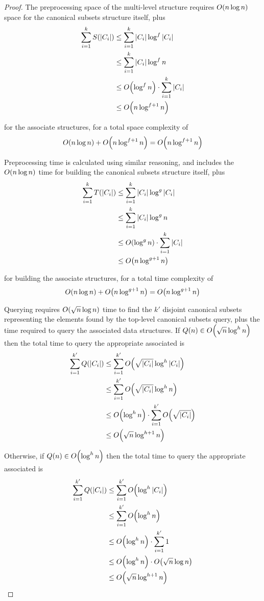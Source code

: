 \begin{proof}
The preprocessing space of the multi-level structure requires $O\!\left(n \log{n}\right)$ space for the canonical subsets structure itself, plus
\[
\begin{split}
\sum_{i=1}^k{S(|C_i|)}
&\leq \sum_{i=1}^k{|C_i| \log^f{|C_i|}} \\
%
&\leq \sum_{i=1}^k{|C_i| \log^f{n}} \\
%
&\leq \BigOh{\log^f{n}} \cdot \sum_{i=1}^k{|C_i|} \\
%
&\leq \BigOh{n\log^{f+1}{n}}
\end{split}
\]

\noindent for the associate structures, for a total space complexity of
\[
O\!\left(n \log{n}\right) + O\!\left(n\log^{f+1}{n}\right) = O\!\left(n\log^{f+1}{n}\right)
\]

Preprocessing time is calculated using similar reasoning, and includes the $O\!\left(n \log{n}\right)$ time for building the canonical subsets structure itself, plus
\[
\begin{split}
\sum_{i=1}^k{T(|C_i|)}
&\leq \sum_{i=1}^k{|C_i| \log^g{|C_i|}} \\
%
&\leq \sum_{i=1}^k{|C_i| \log^g{n}} \\
%
&\leq \BigOh{\log^g{n}} \cdot \sum_{i=1}^k{|C_i|} \\
%
&\leq \BigOh{n\log^{g+1}{n}}
\end{split}
\]

\noindent for building the associate structures, for a total time complexity of 
\[
O\!\left(n \log{n}\right) + O\!\left(n\log^{g+1}{n}\right) = O\!\left(n\log^{g+1}{n}\right)
\]

Querying requires $O\!\left(\sqrt{n}\log{n}\right)$ time to find the $k'$ disjoint canonical subsets representing the elements found by the top-level canonical subsets query, plus the time required to query the associated data structures.  If $Q(n) \in O\!\left(\sqrt{n}\log^h{n}\right)$ then the total time to query the appropriate associated is
\[
\begin{split}
\sum_{i=1}^{k'}{Q(|C_i|)}
&\leq \sum_{i=1}^{k'}{\BigOh{\sqrt{|C_i|}\log^h{|C_i|}}} \\
%
&\leq \sum_{i=1}^{k'}{\BigOh{\sqrt{|C_i|}\log^h{n}}} \\
%
&\leq \BigOh{\log^h{n}} \cdot \sum_{i=1}^{k'}{\BigOh{\sqrt{|C_i|}}} \\
%
&\leq \BigOh{\sqrt{n}\log^{h+1}{n}} \\
\end{split}
\]

\noindent Otherwise, if $Q(n) \in O\!\left(\log^h{n}\right)$ then the total time to query the appropriate associated is
\[
\begin{split}
\sum_{i=1}^{k'}{Q(|C_i|)}
&\leq \sum_{i=1}^{k'}{\BigOh{\log^h{|C_i|}}} \\
%
&\leq \sum_{i=1}^{k'}{\BigOh{\log^h{n}}} \\
%
&\leq \BigOh{\log^h{n}} \cdot \sum_{i=1}^{k'}{1} \\
%
&\leq \BigOh{\log^h{n}} \cdot \BigOh{\sqrt{n}\log{n}}\\
%
&\leq \BigOh{\sqrt{n}\log^{h+1}{n}} \\
\end{split}
\]


\end{proof}

